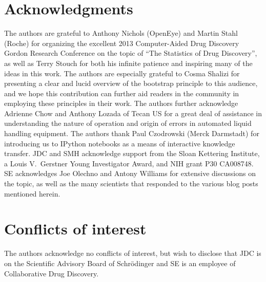 \documentclass[aps,pre,twocolumn,nofootinbib,superscriptaddress,linenumbers]{revtex4-1}
\begin{document}
\section{Acknowledgments}
\label{section:acknowledgments}
The authors are grateful to Anthony Nichols (OpenEye) and Martin Stahl (Roche) for organizing the excellent 2013 Computer-Aided Drug Discovery Gordon Research Conference on the topic of ``The Statistics of Drug Discovery'', as well as Terry Stouch for both his infinite patience and inspiring many of the ideas in this work.
The authors are especially grateful to Cosma Shalizi for presenting a clear and lucid overview of the bootstrap principle to this audience, and we hope this contribution can further aid readers in the community in employing these principles in their work.
The authors further acknowledge Adrienne Chow and Anthony Lozada of Tecan US for a great deal of assistance in understanding the nature of operation and origin of errors in automated liquid handling equipment.
The authors thank Paul Czodrowski (Merck Darmstadt) for introducing us to IPython notebooks as a means of interactive knowledge transfer.
JDC and SMH acknowledge support from the Sloan Kettering Institute, a Louis V.~Gerstner Young Investigator Award, and NIH grant P30 CA008748.
SE acknowledges Joe Olechno and Antony Williams for extensive discussions on the topic, as well as the many scientists that responded to the various blog posts mentioned herein.

\section{Conflicts of interest}
\label{section:conflicts-of-interest}

The authors acknowledge no conflicts of interest, but wish to disclose that JDC is on the Scientific Advisory Board of Schr\"{o}dinger and SE is an employee of Collaborative Drug Discovery.


 

\end{document}
